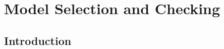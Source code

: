 \chapter{
Model Selection and Checking 
}
\label{chapt.gof}

\vspace{.3in}

\section{Introduction}

